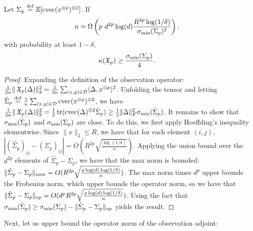 \begin{lemma}
\label{lem:lowRankLower}
Let $\Sigma_p \stackrel{\rm def}{=} \operatorname{\mathbb{E}}[\operatorname{cvec}(x^{\otimes p})^{\otimes 2}]$.
If $$n = \Omega \left( p ~ d^{2p} \log(d) \frac{R^{4p} \log(1/\delta)}{\sigma_\text{\rm min}(\Sigma_p)^2} \right),$$
with probability at least $1-\delta$,
$$\kappa(\operatorname{\mathfrak{X}}_p) \ge \frac{\sigma_\text{\rm min}(\Sigma_p)}{4}.$$
\end{lemma}
\begin{proof}
Expanding the definition of the observation operator:
$\frac{1}{2n} \|\operatorname{\mathfrak{X}}_p(\Delta)\|_2^2
= \frac{1}{2n} \sum_{(x,y) \in \mathcal{D}} \langle \Delta, x^{\otimes p} \rangle^2$.
Unfolding the tensor and letting $\hat\Sigma_p \stackrel{\rm def}{=} \frac{1}{n} \sum_{(x,y) \in \mathcal{D}} \operatorname{cvec}(x^{\otimes p})^{\otimes 2}$,
we have 
$\frac{1}{2n} \|\operatorname{\mathfrak{X}}_p(\Delta)\|_2^2
= \frac{1}{2} \operatorname{tr}(\operatorname{cvec}(\Delta)^{\otimes 2} \hat\Sigma_p)
\ge \frac{1}{2} \|\Delta\|_F^2 \sigma_\text{\rm min}(\hat\Sigma_p)$.
It remains to show that $\sigma_\text{\rm min}(\hat\Sigma_p)$ and $\sigma_\text{\rm min}(\Sigma_p)$ are close.
To do this, we first apply Hoeffding's inequality elementwise.
Since $\|x\|_2 \le R$, we have that for each element $(i,j)$,
$|(\hat\Sigma_p)_{ij} - (\Sigma_p)_{ij}| = O(R^{2p}\sqrt{\frac{\log (1/\delta)}{n}})$.
Applying the union bound over the $d^{2p}$ elements of $\hat\Sigma_p - \Sigma_p$,
we have that the max norm is bounded:
$\|\hat\Sigma_p - \Sigma_p\|_\text{\rm max} = O(R^{2p} \sqrt{\frac{p \log(d) \log (1/\delta)}{n}})$.
The max norm times $d^p$ upper bounds the Frobenius norm, which upper bounds the operator norm, so we have that
$\|\hat\Sigma_p - \Sigma_p\|_\text{\rm op} = O(d^p R^{2p} \sqrt{\frac{p \log(d) \log (1/\delta)}{n}})$.
Using the fact that $\sigma_\text{\rm min}(\hat\Sigma_p) \ge \sigma_\text{\rm min}(\Sigma_p) - \|\hat\Sigma_p - \Sigma_p\|_\text{\rm op}$
yields the result.
\end{proof}

Next, let us upper bound the operator norm of the observation adjoint:

